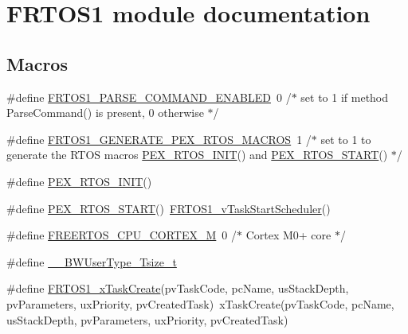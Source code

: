 \hypertarget{group___f_r_t_o_s1__module}{}\section{F\+R\+T\+O\+S1 module documentation}
\label{group___f_r_t_o_s1__module}
\subsection*{Macros}
\begin{DoxyCompactItemize}
\item 
\#define \hyperlink{group___f_r_t_o_s1__module_ga7f7bad2d2773d90a6f489fc082f5a468}{F\+R\+T\+O\+S1\+\_\+\+P\+A\+R\+S\+E\+\_\+\+C\+O\+M\+M\+A\+N\+D\+\_\+\+E\+N\+A\+B\+L\+ED}~0 /$\ast$ set to 1 if method Parse\+Command() is present, 0 otherwise $\ast$/
\item 
\#define \hyperlink{group___f_r_t_o_s1__module_ga8175ab6e3cdee169c1b207249c018fbc}{F\+R\+T\+O\+S1\+\_\+\+G\+E\+N\+E\+R\+A\+T\+E\+\_\+\+P\+E\+X\+\_\+\+R\+T\+O\+S\+\_\+\+M\+A\+C\+R\+OS}~1  /$\ast$ set to 1 to generate the R\+T\+OS macros \hyperlink{group___f_r_t_o_s1__module_ga2ba609c134ea5b867c383afbd7191df0}{P\+E\+X\+\_\+\+R\+T\+O\+S\+\_\+\+I\+N\+IT}() and \hyperlink{group___f_r_t_o_s1__module_ga78984a86d3c0738dfba6c7cffb1f9766}{P\+E\+X\+\_\+\+R\+T\+O\+S\+\_\+\+S\+T\+A\+RT}() $\ast$/
\item 
\#define \hyperlink{group___f_r_t_o_s1__module_ga2ba609c134ea5b867c383afbd7191df0}{P\+E\+X\+\_\+\+R\+T\+O\+S\+\_\+\+I\+N\+IT}()
\item 
\#define \hyperlink{group___f_r_t_o_s1__module_ga78984a86d3c0738dfba6c7cffb1f9766}{P\+E\+X\+\_\+\+R\+T\+O\+S\+\_\+\+S\+T\+A\+RT}()~\hyperlink{group___f_r_t_o_s1__module_gaf792f2c8cca61f076134b057f6029677}{F\+R\+T\+O\+S1\+\_\+v\+Task\+Start\+Scheduler}()
\item 
\#define \hyperlink{group___f_r_t_o_s1__module_gabee351bd31e8f22c295e36727dc0da2a}{F\+R\+E\+E\+R\+T\+O\+S\+\_\+\+C\+P\+U\+\_\+\+C\+O\+R\+T\+E\+X\+\_\+M}~0 /$\ast$ Cortex M0+ core $\ast$/
\item 
\#define \hyperlink{group___f_r_t_o_s1__module_gac3c1de9aa16951baa6a82649a5708f0a}{\+\_\+\+\_\+\+B\+W\+User\+Type\+\_\+\+Tsize\+\_\+t}
\item 
\#define \hyperlink{group___f_r_t_o_s1__module_ga55bf9a88570413122c2313f4c889b1e4}{F\+R\+T\+O\+S1\+\_\+x\+Task\+Create}(pv\+Task\+Code,  pc\+Name,  us\+Stack\+Depth,  pv\+Parameters,  ux\+Priority,  pv\+Created\+Task)~x\+Task\+Create(pv\+Task\+Code, pc\+Name, us\+Stack\+Depth, pv\+Parameters, ux\+Priority, pv\+Created\+Task)

\end{DoxyCompactItemize}
